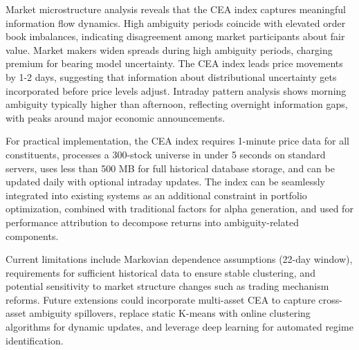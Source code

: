 \documentclass[preprint,12pt,authoryear]{elsarticle}
\begin{document}


Market microstructure analysis reveals that the CEA index captures meaningful information flow dynamics. High ambiguity periods coincide with elevated order book imbalances, indicating disagreement among market participants about fair value. Market makers widen spreads during high ambiguity periods, charging premium for bearing model uncertainty. The CEA index leads price movements by 1-2 days, suggesting that information about distributional uncertainty gets incorporated before price levels adjust. Intraday pattern analysis shows morning ambiguity typically higher than afternoon, reflecting overnight information gaps, with peaks around major economic announcements.

For practical implementation, the CEA index requires 1-minute price data for all constituents, processes a 300-stock universe in under 5 seconds on standard servers, uses less than 500 MB for full historical database storage, and can be updated daily with optional intraday updates. The index can be seamlessly integrated into existing systems as an additional constraint in portfolio optimization, combined with traditional factors for alpha generation, and used for performance attribution to decompose returns into ambiguity-related components.

Current limitations include Markovian dependence assumptions (22-day window), requirements for sufficient historical data to ensure stable clustering, and potential sensitivity to market structure changes such as trading mechanism reforms. Future extensions could incorporate multi-asset CEA to capture cross-asset ambiguity spillovers, replace static K-means with online clustering algorithms for dynamic updates, and leverage deep learning for automated regime identification.
\end{document}
